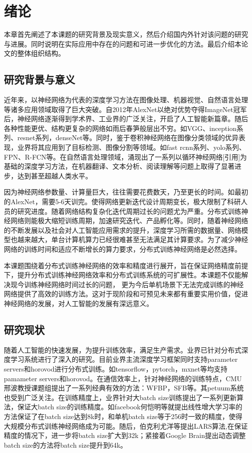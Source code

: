 \chapter{绪论}
本章首先阐述了本课题的研究背景及现实意义，然后介绍国内外针对该问题的研究与进展。同时说明在实际应用中存在的问题和可进一步优化的方法。最后介绍本论文的整体组织结构。
\section{研究背景与意义}
近年来，以神经网络为代表的深度学习方法在图像处理、机器视觉、自然语言处理等诸多应用领域取得了巨大突破。自2012年AlexNet以绝对优势夺得ImageNet冠军后，神经网络逐渐得到学术界、工业界的广泛关注，开启了人工智能新篇章。随后各种性能更优、结构更复杂的网络如雨后春笋般层出不穷。如VGG、inception系列、resnet系列，denseNet等。同时，鉴于卷积神经网络在图像分类领域的优异表现，业界将其应用到了目标检测、图像分割等领域。如fast rcnn系列、yolo系列、FPN、R-FCN等。在自然语言处理领域，涌现出了一系列以循环神经网络[引用]为基础的深度学习方法，在机器翻译、文本分析、阅读理解等问题上取得了显著进步，达到甚至超越人类水平。

因为神经网络参数量、计算量巨大，往往需要花费数天，乃至更长的时间。如最初的AlexNet，需要5-6天训完。使得网络更新迭代设计周期变长，极大限制了科研人员的研究进度。随着网络结构复杂化迭代周期过长的问题尤为严重。分布式训练神经网络则能极大缩短训练周期，加速研究迭代、产品孵化等。同时，随着神经网络的不断发展以及社会对人工智能应用需求的提升，深度学习所需的数据量、网络模型也越来越大，单台计算机算力已经很难甚至无法满足其计算要求。为了减少神经网络的训练时间和适应不断增长的算力要求，分布式训练神经网络是必然选择。

本课题围绕着分布式训练神经网络的效率和精度进行展开，旨在保证网络精度前提下，提升分布式训练神经网络效率和分布式训练系统的可扩展性。本课题不仅能解决现今训练神经网络时间过长的问题， 更为今后单机场景下无法完成训练的神经网络提供了高效的训练方法。这对于现阶段和可预见未来都有重要实用价值，促进神经网络的发展，对人工智能的发展有深远意义。

\section{研究现状}
随着人工智能的快速发展，为提升训练效率，满足生产需求。业界已针对分布式深度学习系统进行了深入的研究。目前业界主流深度学习框架同时支持parameter servers和horovod进行分布式训练。如tensorflow，pytorch，mxnet等均支持pamameter servers和horovod。在通信效率上，针对神经网络的训练特点，CMU邢波教授课题组提出了一系列经典有效的方法：WFBP，SFB等。其petuum系统也受到广泛关注。在训练精度上，业界针对大batch size训练提出了一系列更新算法，保证大batch size的训练精度。如facebook何恺明等就提出线性增大学习率的方法保证了在batch size达到8k时，和单机batch size等于256时一致的精度，使得大规模分布式训练神经网络成为可能。随后，伯克利尤洋等提出LARS算法,在保证精度的情况下，进一步将batch size扩大到32k；紧接着Google Brain提出动态调整batch size的方法将batch size提升到64k。

